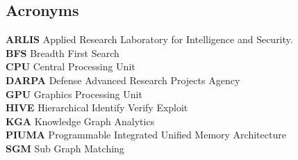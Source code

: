 \documentclass[letterpaper, 10pt]{article}
\begin{document}
\begin{multicols}{2}
{    \section{Acronyms}
        \small{
        \textbf{ARLIS} Applied Research Laboratory for Intelligence and Security.\\ 
        \textbf{BFS} Breadth First Search \\
        \textbf{CPU} Central Processing Unit \\
        \textbf{DARPA} Defense Advanced Research Projects Agency \\ 
        \textbf{GPU} Graphics Processing Unit \\
        \textbf{HIVE} Hierarchical Identify Verify Exploit \\
        \textbf{KGA} Knowledge Graph Analytics \\
        \textbf{PIUMA} Programmable Integrated Unified Memory Architecture \\ 
        \textbf{SGM} Sub Graph Matching \\
        }
    }
    \end{multicols}
    \newpage
\end{document}

